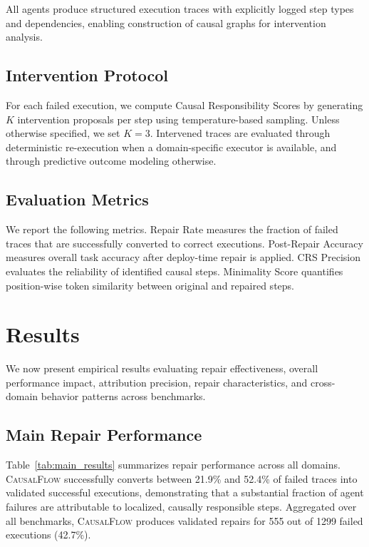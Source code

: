\documentclass{article}
\theoremstyle{plain}
\theoremstyle{definition}
\theoremstyle{remark}
\begin{document}
All agents produce structured execution traces with explicitly logged step types and dependencies, enabling construction of causal graphs for intervention analysis.

\subsection{Intervention Protocol}

For each failed execution, we compute Causal Responsibility Scores by generating $K$ intervention proposals per step using temperature-based sampling. Unless otherwise specified, we set $K=3$. Intervened traces are evaluated through deterministic re-execution when a domain-specific executor is available, and through predictive outcome modeling otherwise. 

\subsection{Evaluation Metrics}

We report the following metrics. Repair Rate measures the fraction of failed traces that are successfully converted to correct executions. Post-Repair Accuracy measures overall task accuracy after deploy-time repair is applied. CRS Precision evaluates the reliability of identified causal steps. Minimality Score quantifies position-wise token similarity between original and repaired steps.


\section{Results}

We now present empirical results evaluating repair effectiveness, overall performance impact, attribution precision, repair characteristics, and cross-domain behavior patterns across benchmarks.

\subsection{Main Repair Performance}

Table~\ref{tab:main_results} summarizes repair performance across all domains. \textsc{CausalFlow} successfully converts between 21.9\% and 52.4\% of failed traces into validated successful executions, demonstrating that a substantial fraction of agent failures are attributable to localized, causally responsible steps. Aggregated over all benchmarks, \textsc{CausalFlow} produces validated repairs for 555 out of 1299 failed executions (42.7\%).
\end{document}
